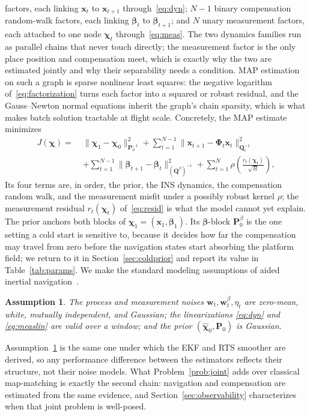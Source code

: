 \documentclass{IEEEtaes}
\newtheorem{assumption}{Assumption}
\begin{document}
factors, each linking $\mathbf{x}_t$ to $\mathbf{x}_{t+1}$
through~\eqref{eq:dyn}; $N{-}1$ binary compensation random-walk factors,
each linking $\boldsymbol{\beta}_t$ to $\boldsymbol{\beta}_{t+1}$; and $N$ unary
measurement factors, each attached to one node $\boldsymbol{\chi}_t$
through~\eqref{eq:meas}. The two dynamics families run as parallel chains that never
touch directly; the measurement factor is the only place position and compensation
meet, which is exactly why the two are estimated jointly and why their separability
needs a condition. MAP estimation on such a graph is sparse nonlinear
least squares: the negative logarithm of~\eqref{eq:factorization} turns each factor
into a squared or robust residual, and the Gauss--Newton normal equations
inherit the graph's chain sparsity, which is what makes batch solution tractable at
flight scale. Concretely, the MAP estimate minimizes
\begin{equation}
\begin{aligned}
J(\boldsymbol{\chi})=\;&\lVert\boldsymbol{\chi}_1-\boldsymbol{\chi}_0\rVert^2_{\mathbf{P}_0^{-1}}
+\sum_{t=1}^{N-1}\lVert\mathbf{x}_{t+1}-\boldsymbol{\Phi}_t\mathbf{x}_t\rVert^2_{\mathbf{Q}_t^{-1}}\\
&+\sum_{t=1}^{N-1}\lVert\boldsymbol{\beta}_{t+1}-\boldsymbol{\beta}_t\rVert^2_{(\mathbf{Q}^{\beta})^{-1}}
+\sum_{t=1}^{N}\rho\!\left(\frac{r_t(\boldsymbol{\chi}_t)}{\sqrt{R}}\right),
\end{aligned}
\label{eq:cost}
\end{equation}
Its four terms are, in order, the prior, the INS dynamics, the compensation
random walk, and the measurement misfit under a possibly robust kernel $\rho$;
the measurement residual $r_t(\boldsymbol{\chi}_t)$ of~\eqref{eq:resid} is what the
model cannot yet explain. The prior anchors both blocks of
$\boldsymbol{\chi}_1=(\mathbf{x}_1,\boldsymbol{\beta}_1)$. Its
$\boldsymbol{\beta}$-block $\mathbf{P}_0^{\beta}$ is the one setting a cold start
is sensitive to, because it decides how far the compensation may travel from zero
before the navigation states start absorbing the platform field; we return to it
in Section~\ref{sec:coldprior} and report its value in Table~\ref{tab:params}.
We make the standard modeling assumptions of aided inertial
navigation~\cite{groves2013,barshalom2001}.
\begin{assumption}\label{as:model}
The process and measurement noises $\mathbf{w}_t,\mathbf{w}^{\beta}_t,\eta_t$ are
zero-mean, white, mutually independent, and Gaussian; the linearizations
\eqref{eq:dyn} and \eqref{eq:measlin} are valid over a window; and the prior
$(\hat{\boldsymbol{\chi}}_0,\mathbf{P}_0)$ is Gaussian.
\end{assumption}
Assumption~\ref{as:model} is the same one under which the EKF and RTS smoother are
derived, so any performance difference between the estimators reflects their
structure, not their noise models. What Problem~\ref{prob:joint} adds over classical
map-matching is exactly the second chain: navigation and compensation are estimated
from the same evidence, and Section~\ref{sec:observability} characterizes when that
joint problem is well-posed.
\end{document}
